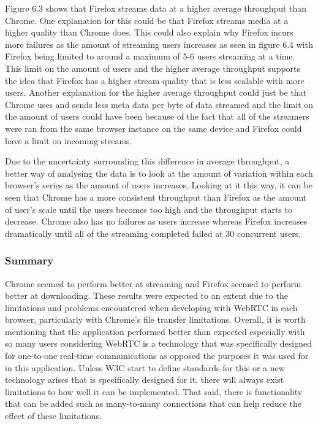 \documentclass[]{report}
\begin{document}
			Figure 6.3 shows that Firefox streams data at a higher average throughput than Chrome. One explanation for this could be that Firefox streams media at a higher quality than Chrome does. This could also explain why Firefox incurs more failures as the amount of streaming users increases as seen in figure 6.4 with Firefox being limited to around a maximum of 5-6 users streaming at a time. This limit on the amount of users and the higher average throughput supports the idea that Firefox has a higher stream quality that is less scalable with more users. Another explanation for the higher average throughput could just be that Chrome uses and sends less meta data per byte of data streamed and the limit on the amount of users could have been because of the fact that all of the streamers were ran from the same browser instance on the same device and Firefox could have a limit on incoming streams.
		 	
			Due to the uncertainty surrounding this difference in average throughput, a better way of analysing the data is to look at the amount of variation within each browser's series as the amount of users increases. Looking at it this way, it can be seen that Chrome has a more consistent throughput than Firefox as the amount of user's scale until the users becomes too high and the throughput starts to decrease. Chrome also has no failures as users increase whereas Firefox increases dramatically until all of the streaming completed failed at 30 concurrent users.
			
			\subsubsection{Summary}
			Chrome seemed to perform better at streaming and Firefox seemed to perform better at downloading. These results were expected to an extent due to the limitations and problems encountered when developing with WebRTC in each browser, particularly with Chrome's file transfer limitations. Overall, it is worth mentioning that the application performed better than expected especially with so many users considering WebRTC is a technology that was specifically designed for one-to-one real-time communications as opposed the purposes it was used for in this application. Unless W3C start to define standards for this or a new technology arises that is specifically designed for it, there will always exist limitations to how well it can be implemented. That said, there is functionality that can be added such as many-to-many connections that can help reduce the effect of these limitations.
		
\end{document}
